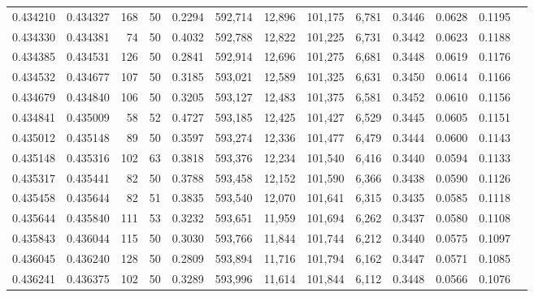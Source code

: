\begin{tabular}{rrrrrrrrrrrrr}
0.434210 & 0.434327 &   168 &  50 &                                     0.2294 & 592,714 &  12,896 & 101,175 &   6,781 & 0.3446 & 0.0628 & 0.1195 \\
0.434330 & 0.434381 &    74 &  50 &                                     0.4032 & 592,788 &  12,822 & 101,225 &   6,731 & 0.3442 & 0.0623 & 0.1188 \\
0.434385 & 0.434531 &   126 &  50 &                                     0.2841 & 592,914 &  12,696 & 101,275 &   6,681 & 0.3448 & 0.0619 & 0.1176 \\
0.434532 & 0.434677 &   107 &  50 &                                     0.3185 & 593,021 &  12,589 & 101,325 &   6,631 & 0.3450 & 0.0614 & 0.1166 \\
0.434679 & 0.434840 &   106 &  50 &                                     0.3205 & 593,127 &  12,483 & 101,375 &   6,581 & 0.3452 & 0.0610 & 0.1156 \\
0.434841 & 0.435009 &    58 &  52 &                                     0.4727 & 593,185 &  12,425 & 101,427 &   6,529 & 0.3445 & 0.0605 & 0.1151 \\
0.435012 & 0.435148 &    89 &  50 &                                     0.3597 & 593,274 &  12,336 & 101,477 &   6,479 & 0.3444 & 0.0600 & 0.1143 \\
0.435148 & 0.435316 &   102 &  63 &                                     0.3818 & 593,376 &  12,234 & 101,540 &   6,416 & 0.3440 & 0.0594 & 0.1133 \\
0.435317 & 0.435441 &    82 &  50 &                                     0.3788 & 593,458 &  12,152 & 101,590 &   6,366 & 0.3438 & 0.0590 & 0.1126 \\
0.435458 & 0.435644 &    82 &  51 &                                     0.3835 & 593,540 &  12,070 & 101,641 &   6,315 & 0.3435 & 0.0585 & 0.1118 \\
0.435644 & 0.435840 &   111 &  53 &                                     0.3232 & 593,651 &  11,959 & 101,694 &   6,262 & 0.3437 & 0.0580 & 0.1108 \\
0.435843 & 0.436044 &   115 &  50 &                                     0.3030 & 593,766 &  11,844 & 101,744 &   6,212 & 0.3440 & 0.0575 & 0.1097 \\
0.436045 & 0.436240 &   128 &  50 &                                     0.2809 & 593,894 &  11,716 & 101,794 &   6,162 & 0.3447 & 0.0571 & 0.1085 \\
0.436241 & 0.436375 &   102 &  50 &                                     0.3289 & 593,996 &  11,614 & 101,844 &   6,112 & 0.3448 & 0.0566 & 0.1076 \\

\end{tabular}
